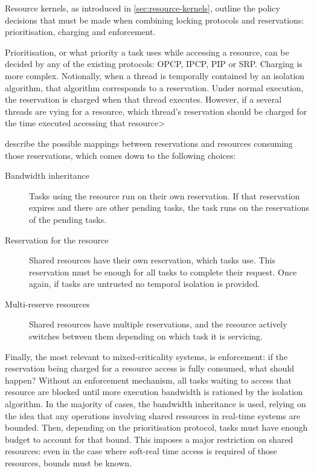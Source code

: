 Resource kernels, as introduced in \cref{sec:resource-kernels}, outline the policy decisions that
must be made when combining locking protocols and reservations: prioritisation, charging and
enforcement. 

Prioritisation, or what priority a task uses while accessing a resource, can be decided by any of
the existing protocols: \gls{OPCP}, \gls{IPCP}, \gls{PIP} or \gls{SRP}. Charging is more complex.
Notionally, when a thread is temporally contained by an isolation algorithm, that algorithm
corresponds to a reservation. Under normal execution, the reservation is charged when that thread
executes. However, if a several threads are vying for a resource, which thread's reservation should
be charged for the time executed accessing that resource> 

\citet{deNiz_LSR_01} describe the possible mappings
between reservations and resources consuming those reservations, which comes down to the following
choices:

\begin{description}
\item[Bandwidth inheritance] Tasks using the resource run on their own reservation.  If that
    reservation expires and there are other pending tasks, the task runs on the reservations of the
    pending tasks. 
\item[Reservation for the resource] Shared resources have their own reservation, which tasks use.
    This reservation must be enough for all tasks to complete their request.  Once again, if tasks
    are untrusted no temporal isolation is provided. 
\item[Multi-reserve resources] Shared resources have multiple reservations, and the resource
    actively switches between them depending on which task it is servicing. 
\end{description} 

Finally, the most relevant to mixed-criticality systems, is enforcement: if the reservation being
charged for a resource access is fully consumed, what should happen? Without an enforcement
mechanism, all tasks waiting to access that resource are blocked until more execution bandwidth is
rationed by the isolation algorithm. In the majority of cases, the bandwidth inheritance is used,
relying on the idea that any operations involving shared resources in real-time systems are bounded.
Then, depending on the prioritisation protocol, tasks must have enough budget to account for that
bound. This imposes a major restriction on shared resources: even in the case where soft-real time
access is required of those resources, bounds must be known.

